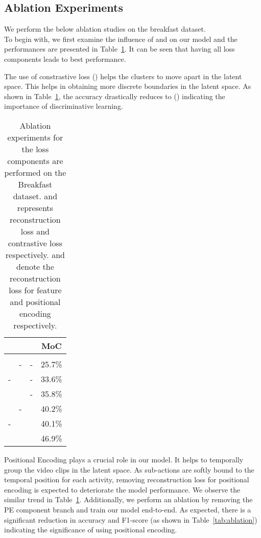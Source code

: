 \documentclass[final]{cvpr}
\newcommand{\cmark}{\ding{51}}
\begin{document}
\subsection{Ablation Experiments}
\label{sec:ablation_exp}
\par We perform the below ablation studies on the breakfast dataset. \\
 To begin with, we first examine the influence of  and  on our model and the performances are presented in Table~\ref{tab:ablation_loss}. It can be seen that having all loss components leads to best performance. 

 The use of constrastive loss () helps the clusters to move apart in the latent space. This helps in obtaining more discrete boundaries in the latent space. As shown in Table~\ref{tab:ablation_loss}, the accuracy drastically reduces to  () indicating the importance of discriminative learning.

\begin{table}
  \caption{{\small Ablation experiments for the loss components are performed on the Breakfast dataset.  and  represents reconstruction loss and contrastive loss respectively.  and  denote the reconstruction loss for feature and positional encoding  respectively.}}
  \label{tab:ablation_loss}
  \centering
  \small
  \begin{tabular}{cc|c|c}
    \toprule
      & &  & \textbf{MoC} \\
     \midrule
      &  & & \\
     \midrule
     \cmark & - & - &25.7\%\\
     - & \cmark & - & 33.6\%\\
     \cmark & \cmark & - & 35.8\%\\ 
     \midrule
     \cmark & - & \cmark &  40.2\%\\
     - & \cmark & \cmark & 40.1\%\\
     \cmark & \cmark & \cmark & 46.9\%\\
    \bottomrule
    \end{tabular}
\end{table}

 Positional Encoding plays a crucial role in our model. It helps to temporally group the video clips in the latent space. As sub-actions are softly bound to the temporal position for each activity, removing reconstruction loss for positional encoding is expected to deteriorate the model performance. We observe the similar trend in Table~\ref{tab:ablation_loss}. Additionally, we perform an ablation by removing the PE component branch and train our model end-to-end. As expected, there is a significant reduction in accuracy and F1-score (as shown in Table~\ref{tab:ablation}) indicating the significance of using positional encoding.
\end{document}
